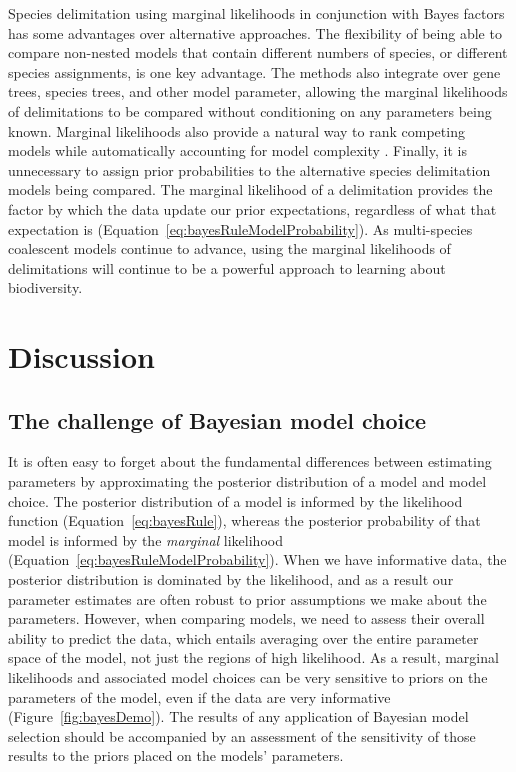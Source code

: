 Species delimitation using marginal likelihoods in conjunction with Bayes
factors has some advantages over alternative approaches.
The flexibility of being able to compare non-nested models that contain
different numbers of species, or different species assignments, is one key
advantage.
The methods also integrate over gene trees, species trees, and other model
parameter, allowing the marginal likelihoods of delimitations to be compared
without conditioning on any parameters being known.
Marginal likelihoods also provide a natural way to rank competing models while
automatically accounting for model complexity \citep{Baele2012}.
Finally, it is unnecessary to assign prior probabilities to the alternative
species delimitation models being compared.
The marginal likelihood of a delimitation provides the factor by which the data
update our prior expectations, regardless of what that expectation is
(Equation~\ref{eq:bayesRuleModelProbability}).
As multi-species coalescent models continue to advance, using the marginal
likelihoods of delimitations will continue to be a powerful approach to
learning about biodiversity.

\section{Discussion}

\subsection{The challenge of Bayesian model choice}

It is often easy to forget about the fundamental differences between estimating
parameters by approximating the posterior distribution of a model and model
choice.
The posterior distribution of a model is informed by the likelihood function
(Equation~\ref{eq:bayesRule}),
whereas the posterior probability of that model is informed by the
\emph{marginal} likelihood
(Equation~\ref{eq:bayesRuleModelProbability}).
When we have informative data, the posterior distribution is dominated by the
likelihood, and as a result our parameter estimates are often robust to prior
assumptions we make about the parameters.
However, when comparing models, we need to assess their overall ability to
predict the data, which entails averaging over the entire parameter space of
the model, not just the regions of high likelihood.
As a result, marginal likelihoods and associated model choices can be very
sensitive to priors on the parameters of the model, even if the data are very
informative (Figure~\ref{fig:bayesDemo}).
The results of any application of Bayesian model selection should be
accompanied by an assessment of the sensitivity of those results to the priors
placed on the models' parameters.


